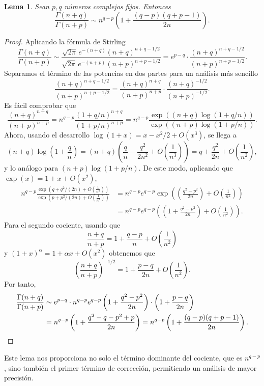 \documentclass[12pt,a4paper]{book}
\newtheorem{lemma}[theorem]{Lema}
\begin{document}
\begin{lemma}
\label{lema:gamma_asintotico}
Sean $p, q$ números complejos fijos. Entonces
\[
\frac{\Gamma(n+q)}{\Gamma(n+p)} \sim n^{q-p} \left(1 + \frac{(q-p)(q+p-1)}{2n} \right).
\]
\end{lemma}
\begin{proof}
Aplicando la fórmula de Stirling
\[
\frac{\Gamma(n+q)}{\Gamma(n+p)} \sim \frac{\sqrt{2\pi} \, e^{-(n+q)} (n+q)^{n+q-1/2}}{\sqrt{2\pi} \, e^{-(n+p)} (n+p)^{n+p-1/2}} = e^{p-q} \cdot \frac{(n+q)^{n+q-1/2}}{(n+p)^{n+p-1/2}}.
\]
Separamos el término de las potencias en dos partes para un análisis más sencillo
\[
\frac{(n+q)^{n+q-1/2}}{(n+p)^{n+p-1/2}} = \frac{(n+q)^{n+q}}{(n+p)^{n+p}} \cdot \frac{(n+q)^{-1/2}}{(n+p)^{-1/2}}.
\]
Es fácil comprobar que
\[
\frac{(n+q)^{n+q}}{(n+p)^{n+p}} = n^{q-p} \frac{(1+q/n)^{n+q}}{(1+p/n)^{n+p}} = n^{q-p} \frac{\exp((n+q)\log(1+q/n))}{\exp((n+p)\log(1+p/n))}.
\]
Ahora, usando el desarrollo $\log(1+x) = x - x^2/2 + O(x^3)$, se llega a
\[
(n+q)\log\left(1+\frac{q}{n}\right) =
(n+q)\left(\frac{q}{n} - \frac{q^2}{2n^2} + O\left(\frac{1}{n^3}\right)\right) = q + \frac{q^2}{2n} + O\left(\frac{1}{n^2}\right),
\]
y lo análogo para $(n+p)\log(1+p/n)$.
De este modo, aplicando que $ \exp(x) = 1 + x + O(x^2)$, 
\begin{align*}
    n^{q-p} \frac{\exp(q + q^2/(2n) + O\left(\frac{1}{n^2}\right))}{\exp(p + p^2/(2n) + O\left(\frac{1}{n^2}\right))} &= n^{q-p} e^{q-p} \exp\left(\left(\frac{q^2 -p^2}{2n}\right) + O\left(\frac{1}{n^2}\right)\right) \\
    &= n^{q-p} e^{q-p} \left(\left(1 + \frac{q^2-p^2}{2n}\right) + O\left(\frac{1}{n^2}\right)\right).
\end{align*}
Para el segundo cociente, usando que 
\[
\frac{n+q}{n+p} = 1+ \frac{q-p}{n} + O\left(\frac{1}{n^2}\right)
\]
y $(1+x)^\alpha = 1+\alpha x +O(x^2)$ obtenemos que
\[
\left(\frac{n+q}{n+p}\right)^{-1/2} = 1+\frac{p-q}{2n} + O\left(\frac{1}{n^2}\right).
\]
Por tanto,
\begin{align*}
   \frac{\Gamma(n+q)}{\Gamma(n+p)} &\sim 
    e^{p-q} \cdot n^{q-p} e^{q-p} \left( 1 + \frac{q^2-p^2}{2n} \right) \cdot \left(1 + \frac{p-q}{2n}\right) \\ &=
    n^{q-p}\left(1 + \frac{q^2-q-p^2+p}{2n}\right) = n^{q-p}\left(1 + \frac{(q-p)(q+p-1)}{2n}\right). 
    \qedhere
\end{align*}
\end{proof}

Este lema nos proporciona no solo el término dominante del cociente, que es $n^{q-p}$, sino también el primer término de corrección, permitiendo un análisis de mayor precisión.
\end{document}
